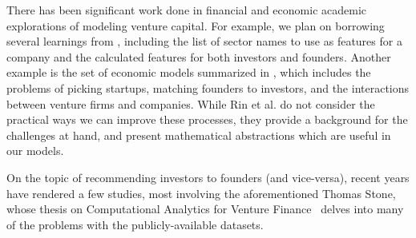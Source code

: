 There has been significant work done in financial and economic academic explorations of modeling venture capital. For example, we plan on borrowing several learnings from \cite{2017arXiv170604229H}, including the list of sector names to use as features for a company and the calculated features for both investors and founders. Another example is the set of economic models summarized in \cite{venture-survey}, which includes the problems of picking startups, matching founders to investors, and the interactions between venture firms and companies. While Rin et al. do not consider the practical ways we can improve these processes, they provide a background for the challenges at hand, and present mathematical abstractions which are useful in our models.

On the topic of recommending investors to founders (and vice-versa), recent years have rendered a few studies, most involving the aforementioned Thomas Stone, whose thesis on Computational Analytics for Venture Finance~\cite{stone2014computational} delves into many of the problems with the publicly-available datasets.
